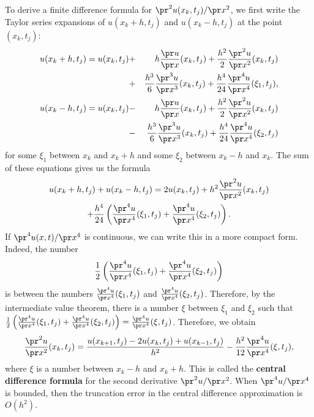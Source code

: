 To derive a finite difference formula for $\pr^2 u(x_k,t_j)/\pr x^2$, we first write the Taylor series expansions
of $u(x_k+h,t_j)$ and $u(x_k-h,t_j)$ at the point $(x_k,t_j)$:
\begin{eqnarray*}
u(x_k+h,t_j)=u(x_k,t_j)&+&h \frac{\pr u}{\pr x}(x_k,t_j)+
\frac{h^2}{2}\frac{\pr^2 u}{\pr x^2}(x_k,t_j)\\
&+&\frac{h^3}{6}\frac{\pr^3 u}{\pr x^3}(x_k,t_{j})+
\frac{h^4}{24}\frac{\pr^4 u}{\pr x^4}(\xi_1,t_{j}), \\
u(x_k-h,t_j)=u(x_k,t_j)&-&h \frac{\pr u}{\pr x}(x_k,t_j)+
\frac{h^2}{2}\frac{\pr^2 u}{\pr x^2}(x_k,t_j)\\
&-&\frac{h^3}{6}\frac{\pr^3 u}{\pr x^3}(x_k,t_{j})+
\frac{h^4}{24}\frac{\pr^4 u}{\pr x^4}(\xi_2,t_{j}) 
\end{eqnarray*}
for some $\xi_{1}$ between $x_{k}$ and $x_{k}+h$
and some $\xi_{2}$ between $x_{k}-h$ and $x_{k}$. 
The sum of these equations gives us the formula
\begin{multline}
u(x_k+h,t_j)+u(x_k-h,t_j)=2u(x_k,t_j)+ h^2\frac{\pr^2 u}{\pr
x^2}(x_k,t_j)\\
+ \frac{h^4}{24}\left(\frac{\pr^4 u}{\pr
x^4}(\xi_1,t_{j}) +\frac{\pr^4 u}{\pr x^4}(\xi_2,t_{j})\right).
\end{multline}
If $\pr^4 u(x,t)/\pr x^4$ is continuous, we can write this in a more compact form. Indeed, the number
\[
\frac{1}{2}\left(\frac{\pr^4 u}{\pr x^4}(\xi_{1}, t_{j})+\frac{\pr^4 u}{\pr x^4}(\xi_{2},t_{j})\right)
\]
is between
the numbers $\frac{\pr^4 u}{\pr x^4}(\xi_{1},t_{j})$ and $\frac{\pr^4 u}{\pr x^4}(\xi_{2},t_{j})$. Therefore,
by the intermediate value theorem, there is a number $\xi$ between $\xi_{1}$ and $\xi_{2}$ such that
$\frac{1}{2}\left(\frac{\pr^4 u}{\pr x^4}(\xi_{1},t_{j})+\frac{\pr^4 u}{\pr x^4}(\xi_{2},t_{j})\right)
=\frac{\pr^4 u}{\pr x^4}(\xi,t_{j})$. Therefore, we obtain
\begin{equation}
\frac{\pr^2 u}{\pr x^2}(x_k,t_j)=\frac{u(x_{k+1},t_j)-2u(x_k,t_j)+u(x_{k-1},t_j)}{h^2}
-\frac{h^2}{12}\frac{\pr^4 u}{\pr x^4}(\xi,t_{j}), \label{a17}
\end{equation}
where $\xi$ is a number between $x_{k}-h$ and $x_{k}+h$.
This is called the {\bf central difference formula} for the second derivative ${\pr^2 u}/{\pr x^2}$. 
When ${\pr^4 u}/{\pr x^4}$ is bounded,
then the truncation error in the central difference approximation is $O(h^2)$.
  
